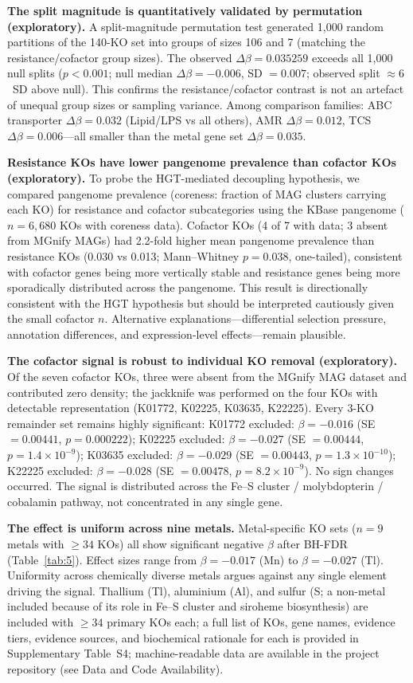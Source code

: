 \documentclass[times]{zHenriquesLab-StyleBioRxiv}
\begin{document}
\textbf{The split magnitude is quantitatively validated by permutation (exploratory).} A split-magnitude permutation test generated 1,000 random
partitions of the 140-KO set into groups of sizes 106 and 7 (matching the
resistance/cofactor group sizes). The observed $\Delta\beta = 0.035259$
exceeds all 1,000 null splits ($p < 0.001$; null median $\Delta\beta =
-0.006$, SD $= 0.007$; observed split $\approx 6$~SD above null). This
confirms the resistance/cofactor contrast is not an artefact of unequal group
sizes or sampling variance. Among comparison families: ABC transporter $\Delta\beta
= 0.032$ (Lipid/LPS vs all others), AMR $\Delta\beta = 0.012$, TCS $\Delta\beta
= 0.006$---all smaller than the metal gene set $\Delta\beta = 0.035$.

\textbf{Resistance KOs have lower pangenome prevalence than cofactor KOs (exploratory).}
To probe the HGT-mediated decoupling hypothesis, we compared pangenome prevalence
(coreness: fraction of MAG clusters carrying each KO) for resistance and cofactor
subcategories using the KBase pangenome ($n = 6{,}680$ KOs with coreness data).
Cofactor KOs (4 of 7 with data; 3 absent from MGnify MAGs) had 2.2-fold higher
mean pangenome prevalence than resistance KOs (0.030 vs 0.013;
Mann--Whitney $p = 0.038$, one-tailed), consistent with cofactor genes being
more vertically stable and resistance genes being more sporadically distributed
across the pangenome. This result is directionally consistent with the HGT
hypothesis but should be interpreted cautiously given the small cofactor $n$.
Alternative explanations---differential selection pressure, annotation differences,
and expression-level effects---remain plausible.

\textbf{The cofactor signal is robust to individual KO removal (exploratory).} Of the seven cofactor KOs, three were absent from the MGnify
MAG dataset and contributed zero density; the jackknife was performed on the
four KOs with detectable representation (K01772, K02225, K03635, K22225). Every
3-KO remainder set remains highly significant: K01772 excluded: $\beta = -0.016$
(SE $= 0.00441$, $p = 0.000222$); K02225 excluded: $\beta = -0.027$
(SE $= 0.00444$, $p = 1.4 \times 10^{-9}$); K03635 excluded: $\beta = -0.029$
(SE $= 0.00443$, $p = 1.3 \times 10^{-10}$); K22225 excluded: $\beta = -0.028$
(SE $= 0.00478$, $p = 8.2 \times 10^{-9}$). No sign changes occurred. The
signal is distributed across the Fe--S cluster / molybdopterin / cobalamin
pathway, not concentrated in any single gene.

\textbf{The effect is uniform across nine metals.} Metal-specific KO sets ($n
= 9$ metals with $\geq 34$ KOs) all show significant negative $\beta$ after
BH-FDR (Table~\ref{tab:5}). Effect sizes range from $\beta = -0.017$ (Mn) to
$\beta = -0.027$ (Tl). Uniformity across chemically diverse metals argues
against any single element driving the signal. Thallium (Tl), aluminium (Al),
and sulfur (S; a non-metal included because of its role in Fe--S cluster and siroheme biosynthesis) are included with $\geq 34$ primary KOs each; a full
list of KOs, gene names, evidence tiers, evidence sources, and biochemical
rationale for each is provided in Supplementary Table~S4; machine-readable
data are available in the project repository (see Data and Code Availability).
\end{document}
